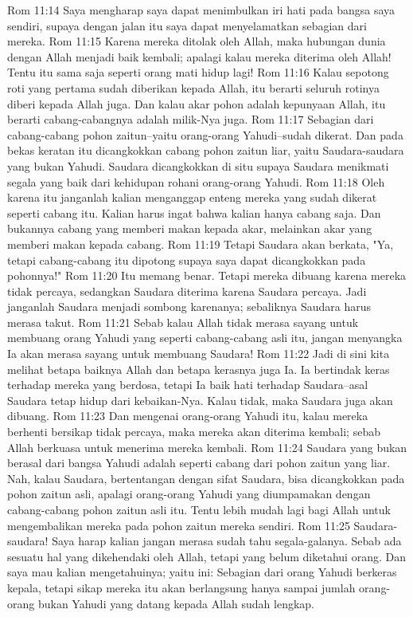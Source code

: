 Rom 11:14  Saya mengharap saya dapat menimbulkan iri hati pada bangsa saya sendiri, supaya dengan jalan itu saya dapat menyelamatkan sebagian dari mereka.
Rom 11:15  Karena mereka ditolak oleh Allah, maka hubungan dunia dengan Allah menjadi baik kembali; apalagi kalau mereka diterima oleh Allah! Tentu itu sama saja seperti orang mati hidup lagi!
Rom 11:16  Kalau sepotong roti yang pertama sudah diberikan kepada Allah, itu berarti seluruh rotinya diberi kepada Allah juga. Dan kalau akar pohon adalah kepunyaan Allah, itu berarti cabang-cabangnya adalah milik-Nya juga.
Rom 11:17  Sebagian dari cabang-cabang pohon zaitun--yaitu orang-orang Yahudi--sudah dikerat. Dan pada bekas keratan itu dicangkokkan cabang pohon zaitun liar, yaitu Saudara-saudara yang bukan Yahudi. Saudara dicangkokkan di situ supaya Saudara menikmati segala yang baik dari kehidupan rohani orang-orang Yahudi.
Rom 11:18  Oleh karena itu janganlah kalian menganggap enteng mereka yang sudah dikerat seperti cabang itu. Kalian harus ingat bahwa kalian hanya cabang saja. Dan bukannya cabang yang memberi makan kepada akar, melainkan akar yang memberi makan kepada cabang.
Rom 11:19  Tetapi Saudara akan berkata, "Ya, tetapi cabang-cabang itu dipotong supaya saya dapat dicangkokkan pada pohonnya!"
Rom 11:20  Itu memang benar. Tetapi mereka dibuang karena mereka tidak percaya, sedangkan Saudara diterima karena Saudara percaya. Jadi janganlah Saudara menjadi sombong karenanya; sebaliknya Saudara harus merasa takut.
Rom 11:21  Sebab kalau Allah tidak merasa sayang untuk membuang orang Yahudi yang seperti cabang-cabang asli itu, jangan menyangka Ia akan merasa sayang untuk membuang Saudara!
Rom 11:22  Jadi di sini kita melihat betapa baiknya Allah dan betapa kerasnya juga Ia. Ia bertindak keras terhadap mereka yang berdosa, tetapi Ia baik hati terhadap Saudara--asal Saudara tetap hidup dari kebaikan-Nya. Kalau tidak, maka Saudara juga akan dibuang.
Rom 11:23  Dan mengenai orang-orang Yahudi itu, kalau mereka berhenti bersikap tidak percaya, maka mereka akan diterima kembali; sebab Allah berkuasa untuk menerima mereka kembali.
Rom 11:24  Saudara yang bukan berasal dari bangsa Yahudi adalah seperti cabang dari pohon zaitun yang liar. Nah, kalau Saudara, bertentangan dengan sifat Saudara, bisa dicangkokkan pada pohon zaitun asli, apalagi orang-orang Yahudi yang diumpamakan dengan cabang-cabang pohon zaitun asli itu. Tentu lebih mudah lagi bagi Allah untuk mengembalikan mereka pada pohon zaitun mereka sendiri.
Rom 11:25  Saudara-saudara! Saya harap kalian jangan merasa sudah tahu segala-galanya. Sebab ada sesuatu hal yang dikehendaki oleh Allah, tetapi yang belum diketahui orang. Dan saya mau kalian mengetahuinya; yaitu ini: Sebagian dari orang Yahudi berkeras kepala, tetapi sikap mereka itu akan berlangsung hanya sampai jumlah orang-orang bukan Yahudi yang datang kepada Allah sudah lengkap.
